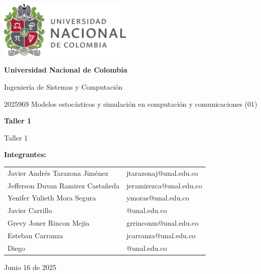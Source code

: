 \documentclass{article}
\begin{document}
\begin{titlepage}
    \centering
    \includegraphics[width=0.48\textwidth]{logo_universidad.png}
    \par\vspace{2cm}

    {\Large \textbf{Universidad Nacional de Colombia} \par}
    \vspace{0.5cm}
    {\large Ingeniería de Sistemas y Computación \par}
    {\large 2025969 Modelos estocásticos y simulación en computación y comunicaciones (01)\par}
    \vspace{3cm}

    {\large \textbf{Taller 1} \par}
    {\large Taller 1 \par}
    \vspace{3cm}

    {\large \textbf{Integrantes:} \par}
    \vspace{0.5cm}
    \begin{tabular}{ll}
    Javier Andrés Tarazona Jiménez & jtarazonaj@unal.edu.co \\
    Jefferson Duvan Ramirez Castañeda & jeramirezca@unal.edu.co \\
    Yenifer Yulieth Mora Segura & ymoras@unal.edu.co \\
    Javier Carrillo & @unal.edu.co \\
    Grevy Joner Rincon Mejia & grrinconm@unal.edu.co \\
    Esteban Carranza & jcarranza@unal.edu.co \\
    Diego & @unal.edu.co \\
    \end{tabular}
    \par\vspace{3cm}

    {\large Junio 16 de 2025 \par}
\end{titlepage}
\end{document}
